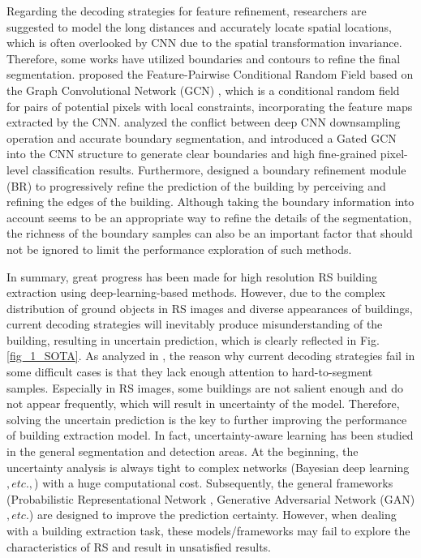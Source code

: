 \documentclass[lettersize,journal]{IEEEtran}
\begin{document}
\par
Regarding the decoding strategies for feature refinement, researchers are suggested to model the long distances and accurately locate spatial locations, which is often overlooked by CNN due to the spatial transformation invariance. Therefore, some works have utilized boundaries and contours to refine the final segmentation. \cite{FPCRF} proposed the Feature-Pairwise Conditional Random Field based on the Graph Convolutional Network (GCN) \cite{GNN}, which is a conditional random field for pairs of potential pixels with local constraints, incorporating the feature maps extracted by the CNN. \cite{gatedGCN_boundary} analyzed the conflict between deep CNN downsampling operation and accurate boundary segmentation, and introduced a Gated GCN into the CNN structure to generate clear boundaries and high fine-grained pixel-level classification results. Furthermore, \cite{CBRNet} designed a boundary refinement module (BR) to progressively refine the prediction of the building by perceiving and refining the edges of the building. Although taking the boundary information into account seems to be an appropriate way to refine the details of the segmentation, the richness of the boundary samples can also be an important factor that should not be ignored to limit the performance exploration of such methods.

\par
In summary, great progress has been made for high resolution RS building extraction using deep-learning-based methods. However, due to the complex distribution of ground objects in RS images and diverse appearances of buildings, current decoding strategies will inevitably produce misunderstanding of the building, resulting in uncertain prediction, which is clearly reflected in Fig. \ref{fig_1_SOTA}.
As analyzed in \cite{What_uncertainties}, the reason why current decoding strategies fail in some difficult cases is that they lack enough attention to hard-to-segment samples. Especially in RS images, some buildings are not salient enough and do not appear frequently, which will result in uncertainty of the model.
Therefore, solving the uncertain prediction is the key to further improving the performance of building extraction model.
In fact, uncertainty-aware learning has been studied in the general segmentation \cite{Phiseg,Assessing_reliability,UGTR} and detection \cite{kraus2019uncertainty} areas. 
At the beginning, the uncertainty analysis is always tight to complex networks (Bayesian deep learning \cite{What_uncertainties,bayesian_uncertainty} $,etc.,$) with a huge computational cost.
Subsequently, the general frameworks (Probabilistic Representational Network \cite{UDNet,UGTR}, Generative Adversarial Network (GAN) $,etc.$) are designed to improve the prediction certainty.
However, when dealing with a building extraction task,
these models/frameworks may fail to explore the characteristics of RS and result in unsatisfied results. 
\end{document}
